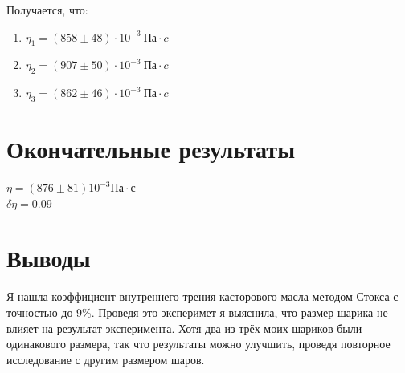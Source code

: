 \documentclass[a4paper]{article}
\begin{document}
Получается, что: 
\begin{enumerate}
    \item $\eta_1 = (858 \pm 48) \cdot 10^{-3} \ Па \cdot c$
    \item $\eta_2 = (907 \pm 50) \cdot 10^{-3} \ Па \cdot c$
    \item $\eta_3 = (862 \pm 46) \cdot 10^{-3} \ Па \cdot c$
\end{enumerate}

\section{ Окончательные результаты}
 $\eta = (876 \pm 81 ) 10^{-3} Па \cdot с$
 \\ $\delta \eta = 0.09$

\section{Выводы}
Я нашла коэффициент внутреннего трения касторового масла методом Стокса с точностью до 9\%.
Проведя это эксперимет я выяснила, что размер шарика не влияет на результат эксперимента. Хотя два из трёх моих шариков были одинакового размера, так что результаты можно улучшить, проведя повторное исследование с другим размером шаров.
\end{document}
